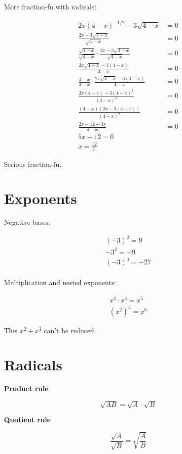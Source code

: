 \documentclass{article}
\begin{document}
More fraction-fu with radicals:

\begin{align*}
    2x(4-x)^{-1/2} - 3 \sqrt{4 - x} &= 0\\
    \frac{2x - 3\sqrt{4-x}}{\sqrt{4-x}} &= 0\\
    \frac{\sqrt{4-x}}{\sqrt{4-x}} \cdot \frac{2x - 3\sqrt{4-x}}{\sqrt{4-x}} &= 0\\
    \frac{2x\sqrt{4-x} - 3(4-x)}{4-x} &= 0\\
    \frac{4-x}{4-x} \cdot \frac{2x\sqrt{4-x} - 3(4-x)}{4-x} &= 0\\
    \frac{2x(4-x) - 3(4-x)^2}{(4-x)^2} &= 0\\
    \frac{(4-x)(2x - 3(4-x))}{(4-x)^2} &= 0\\
    \frac{2x-12 + 3x}{4-x} &= 0\\
    5x - 12 = 0\\
    x = \frac{12}{5}
\end{align*}

Serious fraction-fu.

\section{Exponents}

Negative bases:

\begin{align}
    (-3)^2 = 9\\
    -3^2 = -9\\
    (-3)^3 = -27\\
\end{align}

Multiplication and nested exponents:

\begin{align*}
    x^2 \cdot x^3 = x^5\\
    (x^2)^3 = x^6
\end{align*}

This $x^2 + x^3$ can't be reduced.

\section{Radicals}

\textbf{Product rule}

$$
\sqrt{AB} = \sqrt{A} \cdot \sqrt{B}
$$

\textbf{Quotient rule}

$$
\frac{\sqrt{A}}{\sqrt{B}} = \sqrt{\frac{A}{B}}
$$
\end{document}
